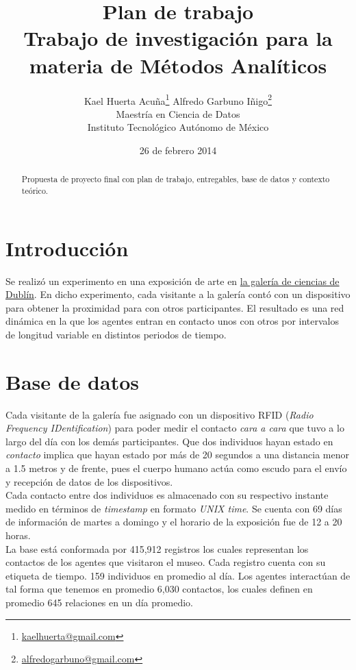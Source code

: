 \documentclass[10pt]{article}
\title{Plan de trabajo \\ {\large Trabajo de investigación
    para la materia de Métodos Analíticos} }
\author{Kael Huerta Acuña\footnote{
  \href{mailto:kaelhuerta@gmail.com}{kaelhuerta@gmail.com} }
  \qquad Alfredo Garbuno Iñigo\footnote{
  \href{mailto:alfredogarbuno@gmail.com}{alfredogarbuno@gmail.com} }\\
    {\small Maestría en Ciencia de Datos} \\
    {\small  Instituto Tecnológico Autónomo de México}}
\date{26 de febrero 2014}
\begin{document}
\maketitle

\begin{abstract}
Propuesta de proyecto final con plan de trabajo, entregables, base de datos y
contexto teórico.
\end{abstract}



\section{Introducción}
\label{sec:intro}

Se realizó un experimento en una exposición de arte en \href{https://dublin.sciencegallery.com/}{la galería de ciencias de Dublín}. En dicho experimento,
cada visitante a la galería contó con un dispositivo para obtener la proximidad
para con otros participantes. El resultado es una red dinámica en la que los
agentes entran en contacto unos con otros por intervalos de longitud variable
en distintos periodos de tiempo.\\



\section{Base de datos}
\label{sec:datos}

Cada visitante de la galería fue asignado con un dispositivo RFID ({\it Radio
Frequency IDentification}) para poder medir el contacto {\it cara a cara} que
tuvo a lo largo del día con los demás participantes. Que dos individuos hayan
estado en {\it contacto} implica que hayan estado por más de 20 segundos a una
distancia menor a 1.5 metros y de frente, pues el cuerpo humano actúa como
escudo para el envío y recepción de datos de los dispositivos.\\

Cada contacto entre dos individuos es almacenado con su respectivo instante
medido en términos de {\it timestamp} en formato {\it UNIX time}. Se cuenta
con 69 días de información de martes a domingo y el horario de la exposición
fue de 12 a 20 horas.\\

La base está conformada por 415,912 registros los cuales representan los contactos de los agentes que visitaron el museo. Cada registro cuenta con su etiqueta de tiempo. 159 individuos en promedio al día. Los agentes interactúan de tal forma que tenemos en promedio 6,030 contactos, los cuales definen en promedio 645 relaciones en un día promedio. 
\end{document}
